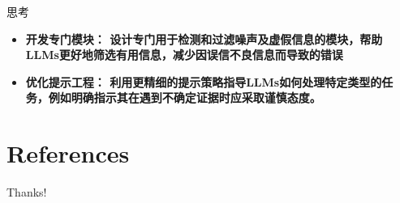 \documentclass{beamer}
\begin{document}
\begin{frame}{思考}
    \begin{itemize}
        \item {\bfseries{开发专门模块：}\normalfont
            设计专门用于检测和过滤噪声及虚假信息的模块，帮助LLMs更好地筛选有用信息，减少因误信不良信息而导致的错误}
        \item {\bfseries{优化提示工程：}\normalfont
            利用更精细的提示策略指导LLMs如何处理特定类型的任务，例如明确指示其在遇到不确定证据时应采取谨慎态度。}
    \end{itemize}
\end{frame}

\section{References}

\begin{frame}[allowframebreaks]
    \nocite{*} %
    
    
\end{frame}

\begin{frame}
    \begin{center}
        {\Huge\calligra Thanks!}
    \end{center}
\end{frame}
\end{document}
